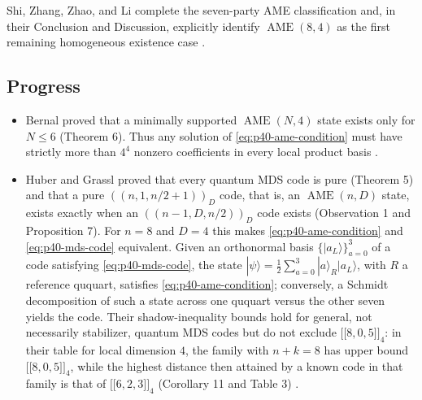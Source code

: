 Shi, Zhang, Zhao, and Li complete the seven-party AME classification and,
in their Conclusion and Discussion, explicitly identify
$\operatorname{AME}(8,4)$ as the first remaining homogeneous existence case
.

\subsection*{Progress}

\begin{itemize}
  \item Bernal proved that a minimally supported $\operatorname{AME}(N,4)$
  state exists only for $N\leq 6$ (Theorem 6).  Thus any solution of
  \eqref{eq:p40-ame-condition} must have strictly more than $4^{4}$ nonzero
  coefficients in every local product basis
  .

  \item Huber and Grassl proved that every quantum MDS code is pure
  (Theorem 5) and that a pure $((n,1,n/2+1))_{D}$ code, that is, an
  $\operatorname{AME}(n,D)$ state, exists exactly when an
  $((n-1,D,n/2))_{D}$ code exists (Observation 1 and Proposition 7).  For
  $n=8$ and $D=4$ this makes \eqref{eq:p40-ame-condition} and
  \eqref{eq:p40-mds-code} equivalent.  Given an orthonormal basis
  $\{|a_L\rangle\}_{a=0}^{3}$ of a code satisfying \eqref{eq:p40-mds-code},
  the state $|\psi\rangle=\tfrac12\sum_{a=0}^{3}|a\rangle_R|a_L\rangle$, with
  $R$ a reference ququart, satisfies \eqref{eq:p40-ame-condition};
  conversely, a Schmidt decomposition of such a state across one ququart
  versus the other seven yields the code.  Their
  shadow-inequality bounds hold for general, not necessarily stabilizer,
  quantum MDS codes but do not exclude
  $\bigl[\!\bigl[8,0,5\bigr]\!\bigr]_{4}$: in their table for local
  dimension $4$, the family with $n+k=8$ has upper bound
  $\bigl[\!\bigl[8,0,5\bigr]\!\bigr]_{4}$, while the highest distance
  then attained by a known code in that family is that of
  $\bigl[\!\bigl[6,2,3\bigr]\!\bigr]_{4}$ (Corollary 11 and Table 3)
  .


\end{itemize}
